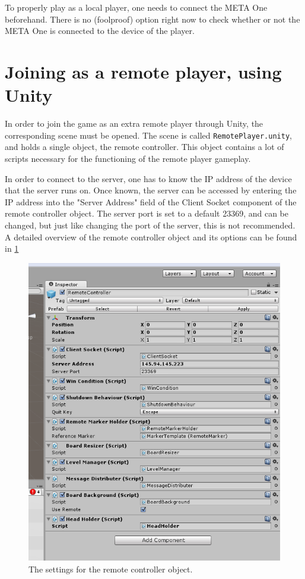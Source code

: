 \documentclass{report}
\begin{document}
	To properly play as a local player, one needs to connect the META One beforehand.
	There is no (foolproof) option right now to check whether or not the META One is
	connected to the device of the player.

\section*{Joining as a remote player, using Unity}
	In order to join the game as an extra remote player through Unity, the corresponding
	scene must be opened. The scene is called \texttt{RemotePlayer.unity}, and holds a 
	single object, the remote controller. This object contains a lot of scripts necessary
	for the functioning of the remote player gameplay.
	
	In order to connect to the server, one has to know the IP address of the
	device that the server runs on. Once known, the server can be accessed by
	entering the IP address into the "Server Address" field of the Client Socket
	component of the remote controller object. The server port is set to a default
	23369, and can be changed, but just like changing the port of the server,
	this is not recommended. A detailed overview of the remote controller object
	and its options can be found in \ref{fig:remotecontroller}
	\begin{figure}[!ht]
	    \centering
	    \includegraphics[scale = 0.6]{RemoteController}
	    \caption{The settings for the remote controller object.}
	    \label{fig:remotecontroller}
	\end{figure}
\end{document}
